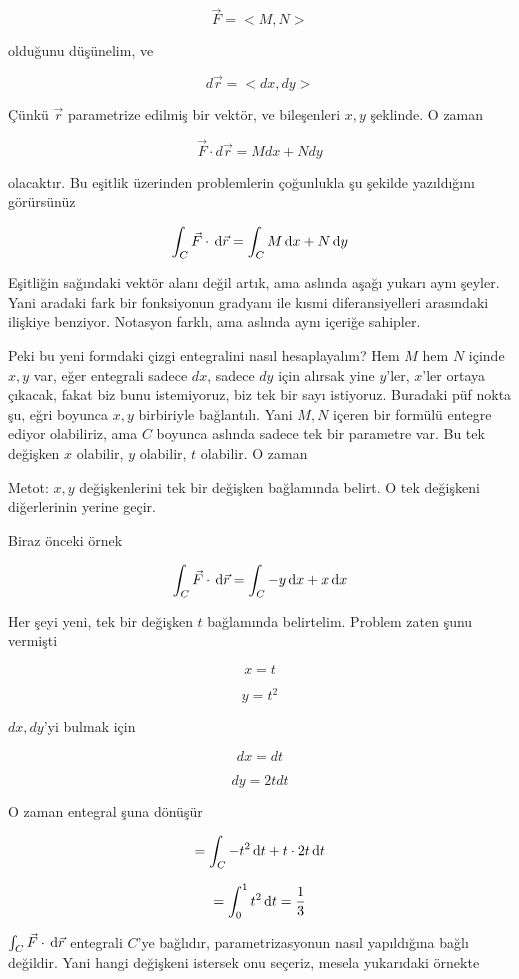 \documentclass[12pt,fleqn]{article}\usepackage{../../common}
\begin{document}
$$ \vec{F} = <M,N> $$

olduğunu düşünelim, ve

$$ d\vec{r} = <dx, dy> $$

Çünkü $\vec{r}$ parametrize edilmiş bir vektör, ve bileşenleri $x,y$
şeklinde. O zaman

$$  \vec{F} \cdot d\vec{r}  = M dx + N dy
$$

olacaktır. Bu eşitlik üzerinden problemlerin çoğunlukla şu şekilde
yazıldığını görürsünüz

$$  \int_C \vec{F} \cdot \,\mathrm{d}\vec{r}  = \int_C M \,\mathrm{d} x + N \,\mathrm{d} y $$

Eşitliğin sağındaki vektör alanı değil artık, ama aslında aşağı yukarı aynı
şeyler. Yani aradaki fark bir fonksiyonun gradyanı ile kısmi diferansiyelleri
arasındaki ilişkiye benziyor. Notasyon farklı, ama aslında aynı içeriğe
sahipler.

Peki bu yeni formdaki çizgi entegralini nasıl hesaplayalım? Hem $M$ hem $N$
içinde $x,y$ var, eğer entegrali sadece $dx$, sadece $dy$ için alırsak yine
$y$'ler, $x$'ler ortaya çıkacak, fakat biz bunu istemiyoruz, biz tek bir sayı
istiyoruz. Buradaki püf nokta şu, eğri boyunca $x,y$ birbiriyle bağlantılı. Yani
$M,N$ içeren bir formülü entegre ediyor olabiliriz, ama $C$ boyunca aslında
sadece tek bir parametre var. Bu tek değişken $x$ olabilir, $y$ olabilir, $t$
olabilir. O zaman

Metot: $x,y$ değişkenlerini tek bir değişken bağlamında belirt. O tek değişkeni
diğerlerinin yerine geçir. 

Biraz önceki örnek

$$
\int_C \vec{F} \cdot \,\mathrm{d}\vec{r} 
= \int_C -y \,\mathrm{d} x + x \,\mathrm{d} x
$$

Her şeyi yeni, tek bir değişken $t$ bağlamında belirtelim. Problem zaten
şunu vermişti

$$ x = t  $$

$$ y = t^2 $$

$dx,dy$'yi bulmak için

$$ dx = dt $$

$$ dy = 2tdt $$

O zaman entegral şuna dönüşür

$$ = \int_C -t^2 \,\mathrm{d} t + t \cdot 2t \,\mathrm{d} t$$

$$ = \int_0^1 t^2 \,\mathrm{d} t = \frac{1}{3}$$

$\int_C \vec{F} \cdot \,\mathrm{d} \vec{r}$ entegrali $C$'ye bağlıdır, parametrizasyonun
nasıl yapıldığına bağlı değildir. Yani hangi değişkeni istersek onu seçeriz,
mesela yukarıdaki örnekte
\end{document}
